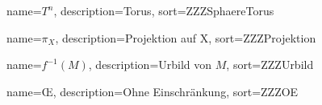 {
  name={\ensuremath{T^n}},
  description={Torus},
  sort=ZZZSphaereTorus
}

{
  name={\ensuremath{\pi_X}},
  description={Projektion auf X},
  sort=ZZZProjektion
}

{
  name={\ensuremath{f^{-1}(M)}},
  description={Urbild von $M$},
  sort=ZZZUrbild
}

{
  name={$\text{\OE}$},
  description={Ohne Einschränkung},
  sort=ZZZOE
}

\renewcommand*{\glossaryname}{\glossarName}

\glsaddall
\printglossaries

